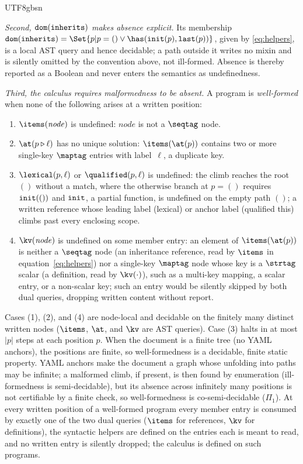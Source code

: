 \begin{CJK*}{UTF8}{gbsn}
\begin{sloppypar}
\emph{Second, $\mathtt{dom}(\mathtt{inherits})$ makes absence explicit.} Its membership
$\dom(\inherits) = \Set{ p | p = () \vee \has(\init(p), \last(p)) }$, given by
\eqref{eq:helpers}, is a local AST query and hence decidable; a path outside it writes no mixin
and is silently omitted by the convention above, not ill-formed. Absence is thereby reported as
a Boolean and never enters the semantics as undefinedness.
\end{sloppypar}

\emph{Third, the calculus requires malformedness to be absent.} A program is \emph{well-formed}
when none of the following arises at a written position:
\begin{enumerate}
  \item $\items(\mathit{node})$ is undefined: $\mathit{node}$ is not a $\seqtag$ node.
  \item $\at(p \snoc \ell)$ has no unique solution: $\items(\at(p))$ contains two or more
        single-key $\maptag$ entries with label~$\ell$, a duplicate key.
  \item $\lexical(p, \ell)$ or $\qualified(p, \ell)$ is undefined: the climb
        reaches the root $()$ without a match, where the $\text{otherwise}$ branch at $p = ()$ requires
        $\mathtt{init}(())$ and $\mathtt{init}$, a partial function, is undefined on the empty
        path $()$; a written reference whose leading label (lexical) or
        anchor label (qualified this) climbs past every enclosing scope.
  \item $\kv(\mathit{node})$ is undefined on some member
        entry: an element of $\items(\at(p))$ is neither a $\seqtag$ node
        (an inheritance reference, read by $\items$ in
        equation~\eqref{eq:helpers}) nor a single-key $\maptag$ node whose
        key is a $\strtag$ scalar (a definition, read by
        $\kv(\cdot)$), such as a multi-key mapping, a scalar entry,
        or a non-scalar key; such an entry would be silently skipped by
        both dual queries, dropping written content without report.
\end{enumerate}
Cases (1), (2), and (4) are node-local and decidable on the finitely many distinct written
nodes ($\items$, $\at$, and $\kv$ are AST queries). Case (3) halts in at most $|p|$
steps at each position $p$. When the document is a finite tree (no YAML anchors), the positions are finite, so
well-formedness is a decidable, finite static property. YAML anchors make the document a graph
whose unfolding into paths may be infinite; a malformed climb, if present, is then found by
enumeration (ill-formedness is semi-decidable), but its absence across infinitely many positions
is not certifiable by a finite check, so well-formedness is co-semi-decidable ($\Pi_1$). At every
written position of a well-formed program every member entry is consumed by exactly one of the
two dual queries ($\items$ for references, $\kv$ for definitions), the syntactic
helpers are defined on the entries each is meant to read, and no written entry is silently
dropped; the calculus is defined on such programs.


\end{CJK*}
